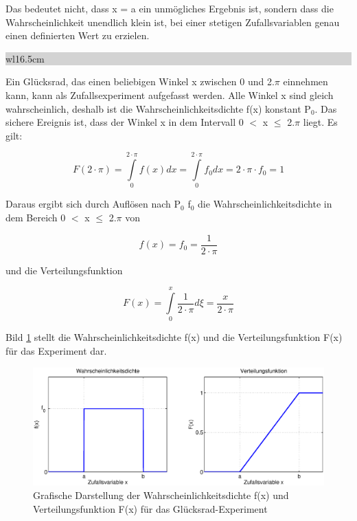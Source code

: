\noindent Das bedeutet nicht, dass x = a ein unm\"{o}gliches Ergebnis ist, sondern dass die Wahrscheinlichkeit unendlich klein ist, bei einer stetigen Zufallsvariablen genau einen definierten Wert zu erzielen.\bigskip

\noindent
\colorbox{lightgray}{%
%
\renewcommand\arraystretch{0.6}%
\begin{tabular}{ wl{16.5cm} }
{}
\end{tabular}%
}\medskip 

\noindent Ein Gl\"{u}cksrad, das einen beliebigen Winkel x zwischen 0 und 2$.\pi$ einnehmen kann, kann als Zufallsexperiment aufgefasst werden. Alle Winkel x sind gleich wahrscheinlich, deshalb ist die Wahrscheinlichkeitsdichte f(x) konstant P${}_{0}$. Das sichere Ereignis ist, dass der Winkel x in dem Intervall 0 $\mathrm{<}$ x $\leq$ 2$.\pi$ liegt. Es gilt:

\begin{equation}\label{eq:foureighteen}
F(2\cdot \pi )=\int\limits _{0}^{2\cdot \pi }f(x)dx =\int\limits _{0}^{2\cdot \pi }f_{0} dx =2\cdot \pi \cdot f_{0} =1
\end{equation}

\noindent Daraus ergibt sich durch Aufl\"{o}sen nach P$_{0}$ f$_{0}$ die Wahrscheinlichkeitsdichte in dem Bereich 0 $\mathrm{<}$ x $\leq$ 2$.\pi$ von

\begin{equation}\label{eq:fournineteen}
f(x)=f_{0} =\dfrac{1}{2\cdot \pi} 
\end{equation}

\noindent und die Verteilungsfunktion

\begin{equation}\label{eq:fourtwenty}
F(x)=\int\limits _{0}^{x}\dfrac{1}{2\cdot \pi } d\xi  =\dfrac{x}{2\cdot \pi}
\end{equation}

\noindent Bild \ref{fig:Gleichverteilung} stellt die Wahrscheinlichkeitsdichte f(x) und die Verteilungsfunktion F(x) f\"{u}r das Experiment dar.

\noindent 
\begin{figure}[H]
  \centerline{\includegraphics[width=1\textwidth]{Kapitel4/Bilder/image3}}
  \caption{Grafische Darstellung der Wahrscheinlichkeitsdichte f(x) und Verteilungsfunktion F(x) f\"{u}r das Gl\"{u}cksrad-Experiment}
  \label{fig:Gleichverteilung}
\end{figure}

